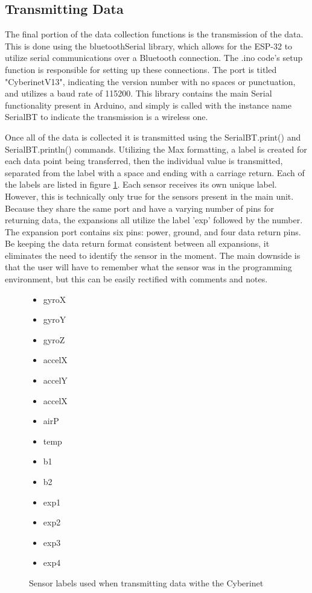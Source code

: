 \subsection{Transmitting Data}
The final portion of the data collection functions is the transmission of the data. This is done using the bluetoothSerial library, which allows for the ESP-32 to utilize serial communications over a Bluetooth connection. The .ino code's setup function is responsible for setting up these connections. The port is titled "CyberinetV13", indicating the version number with no spaces or punctuation, and utilizes a baud rate of 115200. This library contains the main Serial functionality present in Arduino, and simply is called with the instance name SerialBT to indicate the transmission is a wireless one.

Once all of the data is collected it is transmitted using the SerialBT.print() and SerialBT.println() commands. Utilizing the Max formatting, a label is created for each data point being transferred, then the individual value is transmitted, separated from the label with a space and ending with a carriage return. Each of the labels are listed in figure \ref{fig:sensorLAbels}. Each sensor receives its own unique label. However, this is technically only true for the sensors present in the main unit. Because they share the same port and have a varying number of pins for returning data, the expansions all utilize the label 'exp' followed by the number. The expansion port contains six pins: power, ground, and four data return pins. Be keeping the data return format consistent between all expansions, it eliminates the need to identify the sensor in the moment. The main downside is that the user will have to remember what the sensor was in the programming environment, but this can be easily rectified with comments and notes.

\begin{figure}
    \centering
    \begin{itemize}
    \item gyroX
    \item gyroY
    \item gyroZ
    \item accelX
    \item accelY
    \item accelX
    \item airP
    \item temp
    \item b1
    \item b2
    \item exp1
    \item exp2
    \item exp3
    \item exp4
\end{itemize}
    \caption{Sensor labels used when transmitting data withe the Cyberinet}
    \label{fig:sensorLAbels}
\end{figure}

